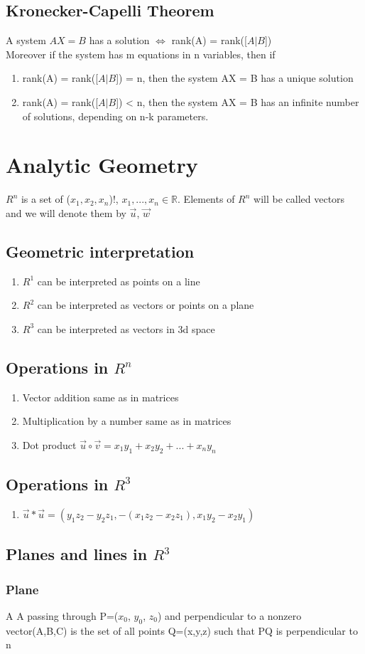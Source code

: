 \documentclass{report}
\begin{document}
\section{Kronecker-Capelli Theorem}
A system $AX = B$ has a solution $ \Leftrightarrow $ rank(A) = rank([$A | B$]) \\
Moreover if the system has m equations in n variables, then if 
\begin{enumerate}
	\item rank(A) = rank([$A | B$]) = n, then the system AX = B has a unique solution
	\item rank(A) = rank([$A | B$]) < n, then the system AX = B has an infinite number of solutions, depending on n-k parameters.
\end{enumerate}


\chapter{Analytic Geometry}
$R^n$ is a set of {($x_1, x_2, x_n$)!, $x_1, ..., x_n \in\mathbb{R}$}. Elements of $R^n$ will be called vectors and we will denote them by $\vec{u}$, $\vec{w}$

\section{Geometric interpretation}
\begin{enumerate}
	\item $R^1$ can be interpreted as points on a line
	\item $R^2$ can be interpreted as vectors or points on a plane
	\item $R^3$ can be interpreted as vectors in 3d space
\end{enumerate}

\section{Operations in $R^n$}
\begin{enumerate}
	\item Vector addition same as in matrices
	\item Multiplication by a number same as in matrices
	\item Dot product $\vec{u} \circ \vec{v} = x_1y_1 + x_2y_2 + ... + x_ny_n$
\end{enumerate}

\section{Operations in $R^3$}
\begin{enumerate}
	\item $\vec{u} * \vec{u} = (y_1z_2 - y_2z_1, -(x_1z_2 - x_2z_1), x_1y_2-x_2y_1)$
\end{enumerate}
\section{Planes and lines in $R^3$}
\subsection{Plane}
A  A passing through P=($x_0$, $y_0$, $z_0$) and perpendicular to a nonzero vector(A,B,C) is the set of all points Q=(x,y,z) such that PQ is perpendicular to n
\end{document}
